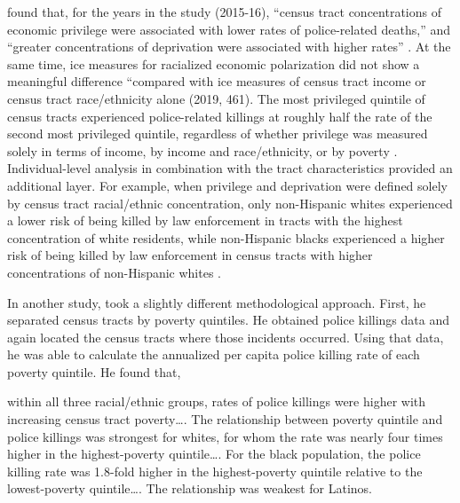 \documentclass[12pt]{article}
\renewenvironment{quote}
  {\list{}{\leftmargin=\parindent\rightmargin=0pt}%
   \item\relax}
  {\endlist}
\begin{document}
\citeauthor{feldmanPoliceRelatedDeathsNeighborhood2019} found that, for the years in the study (2015-16), “census tract concentrations of economic privilege were associated with lower rates of police-related deaths,” and “greater concentrations of deprivation were associated with higher rates” \parencite*[461]{feldmanPoliceRelatedDeathsNeighborhood2019}. At the same time, \acrshort{ice} measures for racialized economic polarization did not show a meaningful difference “compared with \acrshort{ice} measures of census tract income or census tract race/ethnicity alone (2019, 461). The most privileged quintile of census tracts experienced police-related killings at roughly half the rate of the second most privileged quintile, regardless of whether privilege was measured solely in terms of income, by income and race/ethnicity, or by poverty \parencite*[461]{feldmanPoliceRelatedDeathsNeighborhood2019}. Individual-level analysis in combination with the tract characteristics provided an additional layer. For example, when privilege and deprivation were defined solely by census tract racial/ethnic concentration, only non-Hispanic whites experienced a lower risk of being killed by law enforcement in tracts with the highest concentration of white residents, while non-Hispanic blacks experienced a higher risk of being killed by law enforcement in census tracts with higher concentrations of non-Hispanic whites \parencite*[461]{feldmanPoliceRelatedDeathsNeighborhood2019}.

In another study, \textcite{feldmanPoliceKillingsUS2020} took a slightly different methodological approach. First, he separated census tracts by poverty quintiles. He obtained police killings data and again located the census tracts where those incidents occurred. Using that data, he was able to calculate the annualized per capita police killing rate of each poverty quintile. He found that,

\begin{quote}
within all three racial/ethnic groups, rates of police killings were higher with increasing census tract poverty…. The relationship between poverty quintile and police killings was strongest for whites, for whom the rate was nearly four times higher in the highest-poverty quintile…. For the black population, the police killing rate was 1.8-fold higher in the highest-poverty quintile relative to the lowest-poverty quintile…. The relationship was weakest for Latinos. \parencite{feldmanPoliceKillingsUS2020}
\end{quote}
\end{document}
